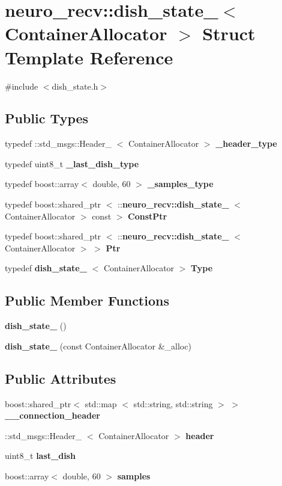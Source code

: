 \section{neuro\-\_\-recv\-:\-:dish\-\_\-state\-\_\-$<$ \-Container\-Allocator $>$ \-Struct \-Template \-Reference}
\label{structneuro__recv_1_1dish__state__}


{\ttfamily \#include $<$dish\-\_\-state.\-h$>$}

\subsection*{\-Public \-Types}
\begin{DoxyCompactItemize}
\item 
typedef \-::std\-\_\-msgs\-::\-Header\-\_\-\*
$<$ \-Container\-Allocator $>$ {\bf \-\_\-header\-\_\-type}
\item 
typedef uint8\-\_\-t {\bf \-\_\-last\-\_\-dish\-\_\-type}
\item 
typedef boost\-::array$<$ double, 60 $>$ {\bf \-\_\-samples\-\_\-type}
\item 
typedef boost\-::shared\-\_\-ptr\*
$<$ \-::{\bf neuro\-\_\-recv\-::dish\-\_\-state\-\_\-}\*
$<$ \-Container\-Allocator $>$ const  $>$ {\bf \-Const\-Ptr}
\item 
typedef boost\-::shared\-\_\-ptr\*
$<$ \-::{\bf neuro\-\_\-recv\-::dish\-\_\-state\-\_\-}\*
$<$ \-Container\-Allocator $>$ $>$ {\bf \-Ptr}
\item 
typedef {\bf dish\-\_\-state\-\_\-}\*
$<$ \-Container\-Allocator $>$ {\bf \-Type}
\end{DoxyCompactItemize}
\subsection*{\-Public \-Member \-Functions}
\begin{DoxyCompactItemize}
\item 
{\bf dish\-\_\-state\-\_\-} ()
\item 
{\bf dish\-\_\-state\-\_\-} (const \-Container\-Allocator \&\-\_\-alloc)
\end{DoxyCompactItemize}
\subsection*{\-Public \-Attributes}
\begin{DoxyCompactItemize}
\item 
boost\-::shared\-\_\-ptr$<$ std\-::map\*
$<$ std\-::string, std\-::string $>$ $>$ {\bf \-\_\-\-\_\-connection\-\_\-header}
\item 
\-::std\-\_\-msgs\-::\-Header\-\_\-\*
$<$ \-Container\-Allocator $>$ {\bf header}
\item 
uint8\-\_\-t {\bf last\-\_\-dish}
\item 
boost\-::array$<$ double, 60 $>$ {\bf samples}
\end{DoxyCompactItemize}


